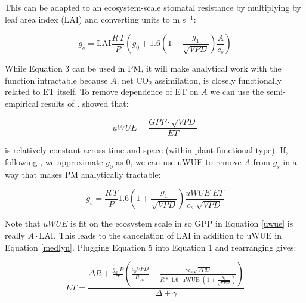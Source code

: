 \documentclass[draft,linenumbers]{agujournal}
\begin{document}
This can be adapted to an ecosystem-scale stomatal resistance by multiplying by leaf area index (LAI) and converting units to m s$^{-1}$:

\begin{linenomath*}
  \label{medlyn}
  \begin{equation}
  g_s = \text{LAI} \frac{R \,T}{P} \left( g_0 + 1.6 \left(1 + \frac{g_1}{\sqrt{VPD}}\right) \frac{A}{c_s}\right)
  \end{equation}
\end{linenomath*}

While Equation 3 can be used in PM, it will make analytical work with the function intractable because $A$, net CO$_2$ assimilation, is closely functionally related to ET itself. To remove dependence of ET on $A$ we can use the semi-empirical results of \citet{Zhou_2015}. \citet{Zhou_2015} showed that:

\begin{linenomath*}
  \begin{equation}
    \label{uwue}
uWUE = \frac{GPP \cdot \sqrt{VPD}}{ET}
  \end{equation}
\end{linenomath*}
is relatively constant across time and space (within plant functional type). If, following \citet{Lin_2015}, we approximate $g_0$ as $0$, we can use uWUE to remove $A$ from $g_s$ in a way that makes PM analytically tractable:

\begin{linenomath*}
  \begin{equation}
  g_s = \frac{R \, T}{P} 1.6 \left(1 + \frac{g_1}{\sqrt{VPD}}\right) \frac{uWUE \; ET}{c_s \; \sqrt{VPD}}
  \end{equation}
\end{linenomath*}

Note that $uWUE$ is fit on the ecosystem scale in \citet{Zhou_2015} so GPP in Equation \ref{uwue} is really $A\cdot \text{LAI}$. This leads to the cancelation of LAI in addition to uWUE in Equation \ref{medlyn}. Plugging Equation 5 into Equation 1 and rearranging gives:

\begin{linenomath*}
  \begin{equation}
    ET = \frac{\Delta R + \frac{g_a\; P}{T} \left( \frac{ c_p VPD}{R_{air}} -  \frac{\gamma c_s \sqrt{VPD} }{ R* \; 1.6\; \text{ uWUE } (1 + \frac{g_1}{\sqrt{VPD}})} \right) }{ \Delta + \gamma}
    \label{et}
  \end{equation}
\end{linenomath*}
\end{document}
